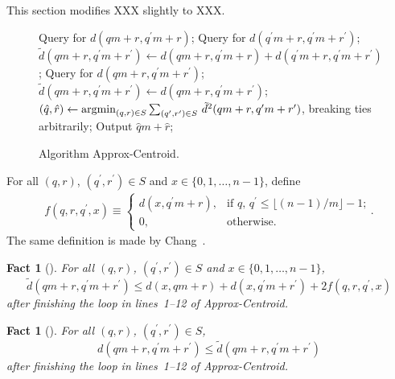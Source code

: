 \documentclass[letterpaper,12pt]{article}
\newtheorem{fact}[theorem]{Fact}
\begin{document}
{{This section modifies XXX slightly to XXX.

\begin{figure}
\begin{algorithmic}[1]
			\STATE Query for $d(q m+r,q^\prime m+r)$;
			\STATE Query for $d(q^\prime m+r,q^\prime m+r^\prime)$;
			\STATE $\tilde{d}(q m+r,q^\prime m+r^\prime)\leftarrow d(q m+r,q^\prime m+r)+d(q^\prime m+r,q^\prime m+r^\prime)$;
		\ELSE
			\STATE Query for $d(q m+r,q^\prime m+r^\prime)$;
			\STATE $\tilde{d}(q m+r,q^\prime m+r^\prime)\leftarrow d(q m+r,q^\prime m+r^\prime)$;
		\ENDIF
	\ENDFOR
\ENDFOR
\STATE $(\hat{q},\hat{r})\leftarrow\mathop{\rm argmin}_{(q,r)\in S}
\sum_{(q^\prime,r^\prime)\in S}\, {\tilde{d}}^2(q m+r,q^\prime m+r^\prime)$,
breaking ties arbitrarily;
\STATE Output $\hat{q} m+\hat{r}$;
\end{algorithmic}
\caption{Algorithm {\sf Approx-Centroid}.}
\label{deterministic16approximationalgorithm}
\end{figure}


For all $(q,r)$, $(q^\prime,r^\prime)\in S$ and $x\in\{0,1,\ldots,n-1\}$,
define
\begin{eqnarray}
f\left(q,r,q^\prime,x\right)
\equiv
\left\{
\begin{array}{ll}
d(x,q^\prime m+r), & \text{if $q$, $q^\prime\le\lfloor(n-1)/m\rfloor-1$;}\\
0, & \text{otherwise.}
\end{array}
\right.
.\label{additionalterm}
\end{eqnarray}
The same definition is made by Chang~\cite{Cha13}.

\begin{fact}[{\cite[Lemma~2]{Cha13}}]\label{pseudodistanceupper}
For all $(q,r)$, $(q^\prime,r^\prime)\in S$ and $x\in\{0,1,\ldots,n-1\}$,
$$
\tilde{d}\left(qm+r,q^\prime m+r^\prime\right)
\le d\left(x,qm+r\right)+d\left(x,q^\prime
m+r^\prime\right)+2f\left(q,r,q^\prime,x\right)
$$
after finishing the loop in lines~1--12 of {\sf Approx-Centroid}.
\end{fact}

\begin{fact}[{\cite[Lemma~4]{Cha13}}]
For all $(q,r)$, $(q^\prime,r^\prime)\in S$,
$$
d\left(qm+r,q^\prime m+r^\prime\right)
\le
\tilde{d}\left(qm+r,q^\prime m+r^\prime\right)
$$
after finishing the loop in lines~1--12 of {\sf Approx-Centroid}.
\end{fact}

}}
\end{document}
